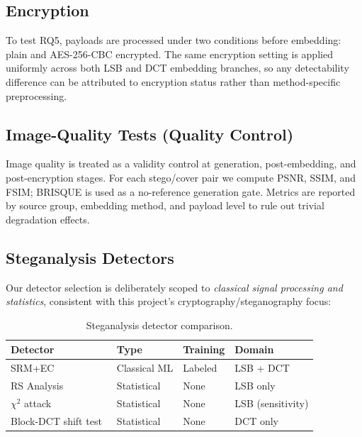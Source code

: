 \documentclass[10pt,twocolumn,a4paper]{article}
\begin{document}
\subsection{Encryption}

To test RQ5, payloads are processed under two conditions before embedding: plain and AES-256-CBC encrypted. The same encryption setting is applied uniformly across both LSB and DCT embedding branches, so any detectability difference can be attributed to encryption status rather than method-specific preprocessing.

\subsection{Image-Quality Tests (Quality Control)}

Image quality is treated as a validity control at generation, post-embedding, and post-encryption stages. For each stego/cover pair we compute PSNR, SSIM, and FSIM; BRISQUE is used as a no-reference generation gate. Metrics are reported by source group, embedding method, and payload level to rule out trivial degradation effects.

\subsection{Steganalysis Detectors}

Our detector selection is deliberately scoped to \emph{classical signal processing and statistics}, consistent with this project's cryptography/steganography focus:

\begin{table}[h]
\centering
\caption{Steganalysis detector comparison.}
\label{tab:detectors}
\scriptsize
\setlength{\tabcolsep}{4pt}
\begin{tabular}{@{}llll@{}}
\toprule
\textbf{Detector} & \textbf{Type} & \textbf{Training} & \textbf{Domain} \\
\midrule
SRM+EC~\cite{fridrich2012srm,kodovsky2012ec} & Classical ML & Labeled & LSB + DCT \\
RS Analysis~\cite{fridrich2001lsb} & Statistical & None & LSB only \\
$\chi^2$ attack~\cite{westfeld1999chi} & Statistical & None & LSB (sensitivity) \\
Block-DCT shift test~\cite{wangmoulin2003dct} & Statistical & None & DCT only \\
\bottomrule
\end{tabular}
\end{table}
\end{document}
